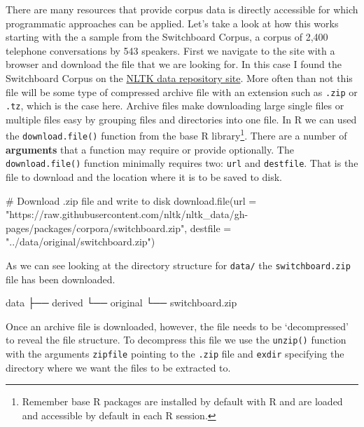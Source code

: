 \documentclass[
  letterpaper,
]{latex/krantz}
\newenvironment{Shaded}{\begin{snugshade}}{\end{snugshade}}
\newcommand{\AttributeTok}[1]{\textcolor[rgb]{0.40,0.45,0.13}{#1}}
\newcommand{\CommentTok}[1]{\textcolor[rgb]{0.37,0.37,0.37}{#1}}
\newcommand{\ExtensionTok}[1]{\textcolor[rgb]{0.00,0.23,0.31}{#1}}
\newcommand{\FunctionTok}[1]{\textcolor[rgb]{0.28,0.35,0.67}{#1}}
\newcommand{\NormalTok}[1]{\textcolor[rgb]{0.00,0.23,0.31}{#1}}
\newcommand{\StringTok}[1]{\textcolor[rgb]{0.13,0.47,0.30}{#1}}
\begin{document}
There are many resources that provide corpus data is directly accessible
for which programmatic approaches can be applied. Let's take a look at
how this works starting with the a sample from the Switchboard Corpus, a
corpus of 2,400 telephone conversations by 543 speakers. First we
navigate to the site with a browser and download the file that we are
looking for. In this case I found the Switchboard Corpus on the
\href{http://www.nltk.org/nltk_data/}{NLTK data repository site}. More
often than not this file will be some type of compressed archive file
with an extension such as \texttt{.zip} or \texttt{.tz}, which is the
case here. Archive files make downloading large single files or multiple
files easy by grouping files and directories into one file. In R we can
used the \texttt{download.file()} function from the base R
library\footnote{Remember base R packages are installed by default with
  R and are loaded and accessible by default in each R session.}. There
are a number of \textbf{arguments} that a function may require or
provide optionally. The \texttt{download.file()} function minimally
requires two: \texttt{url} and \texttt{destfile}. That is the file to
download and the location where it is to be saved to disk.

\begin{Shaded}
\begin{Highlighting}[]
\CommentTok{\# Download .zip file and write to disk}
\FunctionTok{download.file}\NormalTok{(}\AttributeTok{url =} \StringTok{"https://raw.githubusercontent.com/nltk/nltk\_data/gh{-}pages/packages/corpora/switchboard.zip"}\NormalTok{, }\AttributeTok{destfile =} \StringTok{"../data/original/switchboard.zip"}\NormalTok{)}
\end{Highlighting}
\end{Shaded}

As we can see looking at the directory structure for \texttt{data/} the
\texttt{switchboard.zip} file has been downloaded.

\begin{Shaded}
\begin{Highlighting}[]
\ExtensionTok{data}
\ExtensionTok{├──}\NormalTok{ derived}
\ExtensionTok{└──}\NormalTok{ original}
    \ExtensionTok{└──}\NormalTok{ switchboard.zip}
\end{Highlighting}
\end{Shaded}

Once an archive file is downloaded, however, the file needs to be
`decompressed' to reveal the file structure. To decompress this file we
use the \texttt{unzip()} function with the arguments \texttt{zipfile}
pointing to the \texttt{.zip} file and \texttt{exdir} specifying the
directory where we want the files to be extracted to.
\end{document}
